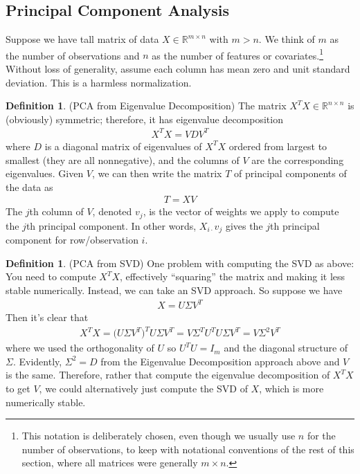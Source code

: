 \documentclass[12pt]{article}
\numberwithin{equation}{section} %
\theoremstyle{plain}
\theoremstyle{definition}
\newtheorem{defn}[thm]{Definition}
\theoremstyle{remark}
\newcommand{\Rmn}{\mathbb{R}^{m\times n}}
\newcommand{\Rnn}{\mathbb{R}^{n\times n}}
\begin{document}
\clearpage
\subsection{Principal Component Analysis}

Suppose we have tall matrix of data $X\in\Rmn$ with $m>n$.
We think of $m$ as the number of observations and $n$ as the number of
features or covariates.\footnote{%
  This notation is deliberately chosen, even though we usually use $n$
  for the number of observations, to keep with notational conventions of
  the rest of this section, where all matrices were generally
  $m\times n$.
}
Without loss of generality, assume each
column has mean zero and unit standard deviation. This is a
harmless normalization.

\begin{defn}(PCA from Eigenvalue Decomposition)
The matrix $X^TX\in\Rnn$ is (obviously) symmetric; therefore, it has
eigenvalue decomposition
\begin{align*}
  X^TX = VDV^T
\end{align*}
where $D$ is a diagonal matrix of eigenvalues of $X^TX$ ordered from
largest to smallest (they are all nonnegative), and the columns of $V$
are the corresponding eigenvalues.
Given $V$, we can then write the matrix $T$ of principal components of
the data as
\begin{align*}
  T = XV
\end{align*}
The $j$th column of $V$, denoted $v_j$, is the vector of weights we
apply to compute the $j$th principal component. In other words,
$X_{i\cdot}v_j$ gives the $j$th principal component for row/observation
$i$.
\end{defn}

\begin{defn}(PCA from SVD)
One problem with computing the SVD as above: You need to compute $X^TX$,
effectively ``squaring'' the matrix and making it less stable
numerically. Instead, we can take an SVD approach. So suppose we have
\begin{align*}
  X = U\Sigma V^T
\end{align*}
Then it's clear that
\begin{align*}
  X^TX
  = \big(U\Sigma V^T\big)^TU\Sigma V^T
  = V\Sigma^T U^TU\Sigma V^T
  = V\Sigma^2 V^T
\end{align*}
where we used the orthogonality of $U$ so $U^TU=I_m$ and the diagonal
structure of $\Sigma$. Evidently, $\Sigma^2=D$ from the Eigenvalue
Decomposition approach above and $V$ is the same. Therefore, rather that
compute the eigenvalue decomposition of $X^TX$ to get $V$, we could
alternatively just compute the SVD of $X$, which is more numerically
stable.
\end{defn}
\end{document}
